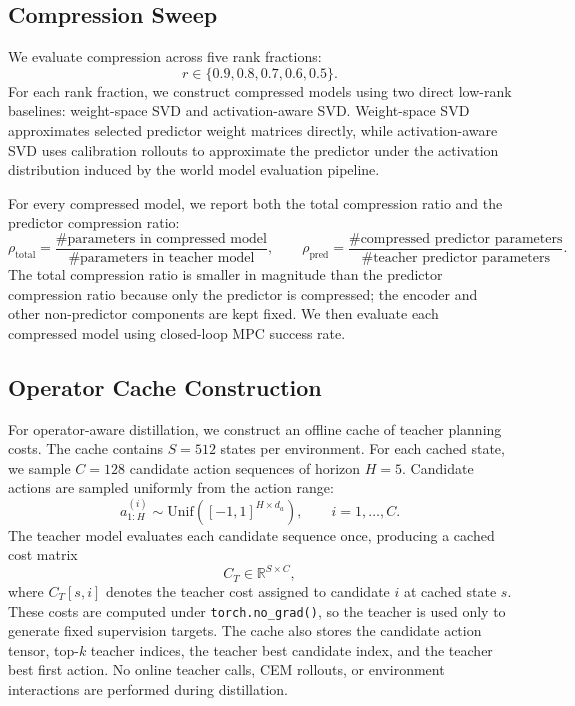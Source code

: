 \documentclass[11pt]{article}
\begin{document}
\subsection{Compression Sweep}
\label{sec:compression_sweep}

We evaluate compression across five rank fractions:
\[
    r \in \{0.9, 0.8, 0.7, 0.6, 0.5\}.
\]
For each rank fraction, we construct compressed models using two direct low-rank baselines: weight-space SVD and activation-aware SVD. Weight-space SVD approximates selected predictor weight matrices directly, while activation-aware SVD uses calibration rollouts to approximate the predictor under the activation distribution induced by the world model evaluation pipeline.

For every compressed model, we report both the total compression ratio and the predictor compression ratio:
\[
    \rho_{\mathrm{total}}
    =
    \frac{\#\text{parameters in compressed model}}
         {\#\text{parameters in teacher model}},
    \qquad
    \rho_{\mathrm{pred}}
    =
    \frac{\#\text{compressed predictor parameters}}
         {\#\text{teacher predictor parameters}}.
\]
The total compression ratio is smaller in magnitude than the predictor compression ratio because only the predictor is compressed; the encoder and other non-predictor components are kept fixed. We then evaluate each compressed model using closed-loop MPC success rate.

\subsection{Operator Cache Construction}
\label{sec:operator_cache}

For operator-aware distillation, we construct an offline cache of teacher planning costs. The cache contains \(S=512\) states per environment. For each cached state, we sample \(C=128\) candidate action sequences of horizon \(H=5\). Candidate actions are sampled uniformly from the action range:
\[
    a_{1:H}^{(i)} \sim \mathrm{Unif}([-1,1]^{H \times d_a}),
    \qquad i=1,\dots,C.
\]
The teacher model evaluates each candidate sequence once, producing a cached cost matrix
\[
    C_T \in \mathbb{R}^{S \times C},
\]
where \(C_T[s,i]\) denotes the teacher cost assigned to candidate \(i\) at cached state \(s\). These costs are computed under \texttt{torch.no\_grad()}, so the teacher is used only to generate fixed supervision targets. The cache also stores the candidate action tensor, top-\(k\) teacher indices, the teacher best candidate index, and the teacher best first action. No online teacher calls, CEM rollouts, or environment interactions are performed during distillation.
\end{document}
